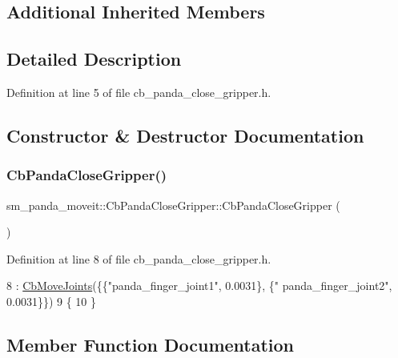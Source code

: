 \subsection*{Additional Inherited Members}


\subsection{Detailed Description}


Definition at line 5 of file cb\+\_\+panda\+\_\+close\+\_\+gripper.\+h.



\subsection{Constructor \& Destructor Documentation}
\mbox{\label{classsm__panda__moveit_1_1CbPandaCloseGripper_a6295c0b99d4b3548f79567d8aaed4b14}} 
\subsubsection{\texorpdfstring{Cb\+Panda\+Close\+Gripper()}{CbPandaCloseGripper()}}
{\footnotesize\ttfamily sm\+\_\+panda\+\_\+moveit\+::\+Cb\+Panda\+Close\+Gripper\+::\+Cb\+Panda\+Close\+Gripper (\begin{DoxyParamCaption}{ }\end{DoxyParamCaption})\hspace{0.3cm}{\ttfamily [inline]}}



Definition at line 8 of file cb\+\_\+panda\+\_\+close\+\_\+gripper.\+h.


\begin{DoxyCode}
8                           : \hyperlink{classmoveit__z__client_1_1CbMoveJoints_a8d9f24fd96baa202c546654f3e92f51c}{CbMoveJoints}(\{\{\textcolor{stringliteral}{"panda\_finger\_joint1"}, 0.0031\}, \{\textcolor{stringliteral}{"
      panda\_finger\_joint2"}, 0.0031\}\})
9     \{
10     \}
\end{DoxyCode}


\subsection{Member Function Documentation}
\mbox{\label{classsm__panda__moveit_1_1CbPandaCloseGripper_a755e506a4c47ec5f1485f2526c8a9e16}} 
